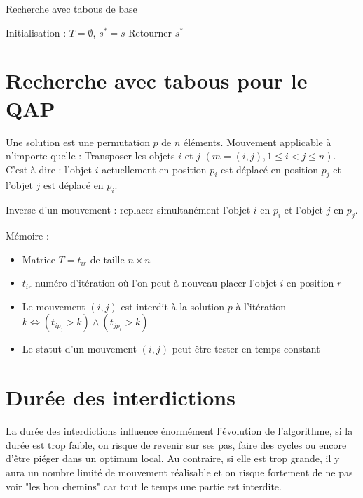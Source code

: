 \documentclass[11pt,a4paper]{report}
\begin{document}
\begin{algorithm}[H]
\caption{Recherche avec tabous de base}
Initialisation : $T = \emptyset$, $s^* = s$\;
Retourner $s^*$\;
\end{algorithm}

\section{Recherche avec tabous pour le QAP}
Une solution est une permutation $p$ de $n$ éléments. Mouvement applicable à n'importe quelle : Transposer les objets $i$ et $j$ $(m=(i,j),1\leq i < j\leq n)$. C'est à dire : l'objet $i$ actuellement en position $p_i$ est déplacé en position $p_j$ et l'objet $j$ est déplacé en $p_i$.

Inverse d'un mouvement : replacer simultanément l'objet $i$ en $p_i$ et l'objet $j$ en $p_j$.

Mémoire : 
\begin{itemize}
    \item Matrice $T=t_{ir}$ de taille $n\times n$
    \item $t_{ir}$ numéro d'itération où l'on peut à nouveau placer l'objet $i$ en position $r$
    \item Le mouvement $(i,j)$ est interdit à la solution $p$ à l'itération $k \Longleftrightarrow (t_{ip_j} > k) \wedge (t_{jp_i} > k)$
    \item Le statut d'un mouvement $(i,j)$ peut être tester en temps constant
\end{itemize}

\section{Durée des interdictions}
La durée des interdictions influence énormément l'évolution de l'algorithme, si la durée est trop faible, on risque de revenir sur ses pas, faire des cycles ou encore d'être piéger dans un optimum local. Au contraire, si elle est trop grande, il y aura un nombre limité de mouvement réalisable et on risque fortement de ne pas voir "les bon chemins" car tout le temps une partie est interdite.
\end{document}
